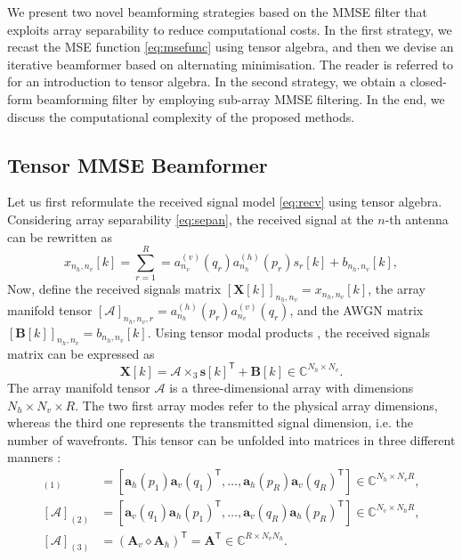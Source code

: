 \documentclass{cta-author}
\newcommand{\mc}[1]{\ensuremath{\mathcal{#1}}}				%
\newcommand{\bmm}[1]{\ensuremath{\mathbb{#1}}}				%
\newcommand{\tran}{\mathsf{T}}						%
\begin{document}
We present two novel beamforming strategies based on the MMSE filter that exploits array separability to reduce computational costs. In the first strategy, we recast the MSE function \eqref{eq:msefunc} using tensor algebra, and then we devise an iterative beamformer based on alternating minimisation. The reader is referred to \cite{kolda_tensor_2009,comon2009tensor} for an introduction to tensor algebra. In the second strategy, we obtain a closed-form beamforming filter by employing sub-array MMSE filtering. In the end, we discuss the computational complexity of the proposed methods.

\subsection{Tensor MMSE Beamformer}
\label{sec:iterative_analyitical}

Let us first reformulate the received signal model \eqref{eq:recv} using tensor algebra. Considering array separability \eqref{eq:sepan}, the received signal at the $n$-th antenna can be rewritten as
\begin{equation} \label{eq:mult_recv_sig}
	x_{n_h, n_v}[k] = \sum_{r=1}^{R} = a_{n_v}^{(v)}(q_r) a_{n_h}^{(h)}(p_r) s_r[k] + b_{n_h, n_v}[k],
\end{equation}
Now, define the received signals matrix $[\bm{X}[k]]_{n_h, n_v} = x_{n_h, n_v}[k]$, the array manifold tensor $[\mc{A}]_{n_h, n_v, r} =  a_{n_h}^{(h)}(p_r)a_{n_v}^{(v)}(q_r)$, and the AWGN matrix $[\bm{B}[k]]_{n_h, n_v} = b_{n_h, n_v}[k]$. Using tensor modal products \cite{kolda_tensor_2009}, the received signals matrix can be expressed as
\begin{equation} \label{eq:tensor_model}
	\bm{X}[k] = \mc{A} \times_3 \bm{s}[k]^\tran + \bm{B}[k] \in \bmm{C}^{N_h \times N_v}.
\end{equation}
The array manifold tensor $\mc{A}$ is a three-dimensional array with dimensions $N_h \times N_v \times R$. The two first array modes refer to the physical array dimensions, whereas the third one represents the transmitted signal dimension, i.e. the number of wavefronts. This tensor can be unfolded into matrices in three different manners \cite{kolda_tensor_2009}:
\begin{align}
	[\mc{A}]_{(1)} &= \left[ \bm{a}_h(p_1)\bm{a}_v(q_1)^\tran, \ldots, \bm{a}_h(p_R)\bm{a}_v(q_R)^\tran \right] \in \bmm{C}^{N_h \times N_v R},\\
	[\mc{A}]_{(2)} &= \left[ \bm{a}_v(q_1)\bm{a}_h(p_1)^\tran, \ldots, \bm{a}_v(q_R)\bm{a}_h(p_R)^\tran \right]\in \bmm{C}^{N_v \times N_h R},\\
	[\mc{A}]_{(3)} &= (\bm{A}_v \diamond \bm{A}_h)^\tran = \bm{A}^\tran \in \bmm{C}^{R \times N_v N_h}.
\end{align}
\end{document}
